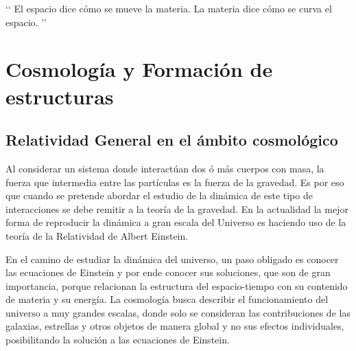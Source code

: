 \begin{savequote}[65mm]
‘‘
El espacio dice cómo se mueve la materia.
La materia dice cómo se curva el espacio.
’’
\end{savequote}




\chapter{Cosmología y Formación de estructuras}
\label{cha:Theoretical Framework}

\section{Relatividad General en el ámbito cosmológico}
\label{sec:IsotropicAndHomogeneousUniverse}
Al considerar un sistema donde interactúan dos ó más cuerpos con masa, la fuerza que intermedia entre las partículas es la fuerza de la gravedad. Es por eso que cuando se pretende abordar el estudio de la dinámica de este tipo de interacciones se debe remitir a la teoría de la gravedad. En la actualidad la mejor forma de reproducir la dinámica a gran escala del Universo es haciendo uso de la teoría de la Relatividad de Albert Einstein.

En el camino de estudiar la dinámica del universo, un  paso obligado es conocer las ecuaciones de Einstein y por ende conocer sus soluciones, que son de gran importancia, porque relacionan la estructura del espacio-tiempo con su contenido de materia y su energía. 
La cosmología busca describir el funcionamiento del universo a muy grandes escalas, donde solo se consideran las contribuciones de las galaxias, estrellas y otros objetos de manera global y no sus efectos individuales, posibilitando la solución a las ecuaciones de Einstein.

